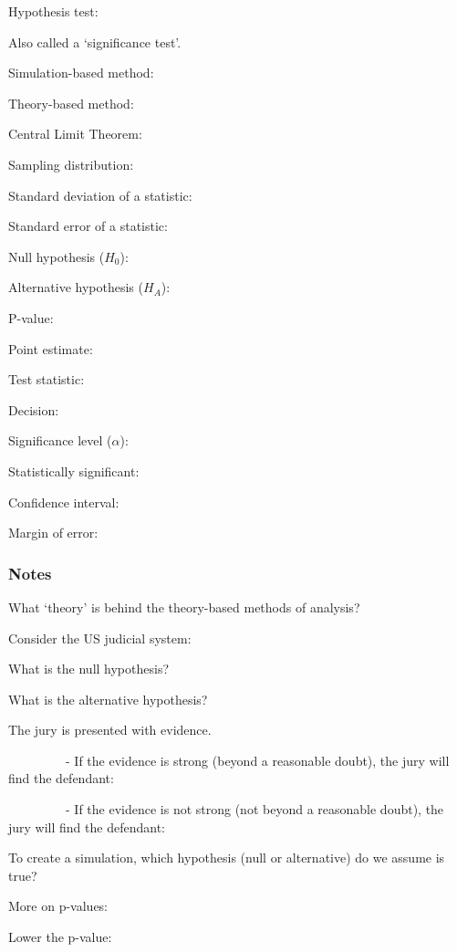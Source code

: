 \documentclass[
]{report}
\newcommand{\rgs}{\vspace{12pt}} %
\newcommand{\rgi}{\hspace{24pt}}  %
\begin{document}
Hypothesis test:

\rgi Also called a `significance test'.
\rgs

Simulation-based method:
\rgs

Theory-based method:
\rgs

Central Limit Theorem:
\rgs

Sampling distribution:
\rgs

Standard deviation of a statistic:
\rgs

Standard error of a statistic:
\rgs

Null hypothesis (\(H_0\)):
\rgs

Alternative hypothesis (\(H_A\)):
\rgs

P-value:
\rgs

Point estimate:
\rgs

Test statistic:
\rgs

Decision:
\rgs

Significance level (\(\alpha\)):
\rgs 

Statistically significant:
\rgs

Confidence interval:
\rgs

Margin of error:
\rgs

\hypertarget{notes-13}{%
\subsubsection*{Notes}\label{notes-13}}

What `theory' is behind the theory-based methods of analysis?
\rgs

Consider the US judicial system:

\rgi What is the null hypothesis?
\rgs

\rgi What is the alternative hypothesis?
\rgs

\rgi The jury is presented with evidence.

~~~~~~~~~- If the evidence is strong (beyond a reasonable doubt), the jury will find the defendant:

\rgs

~~~~~~~~~- If the evidence is not strong (not beyond a reasonable doubt), the jury will find the defendant:

\rgs

To create a simulation, which hypothesis (null or alternative) do we assume is true?
\rgs

More on p-values:

\rgi Lower the p-value:
\rgs
\end{document}
